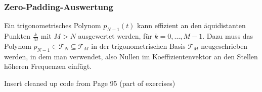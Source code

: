 \newpage
\subsubsection{Zero-Padding-Auswertung}
Ein trigonometrisches Polynom $p_{N - 1}(t)$ kann effizient an den äquidistanten Punkten $\frac{k}{M}$ mit $M > N$ ausgewertet werden, für $k = 0, \ldots, M - 1$.
Dazu muss das Polynom $p_{N - 1} \in \mathcal{T}_N \subseteq \mathcal{T}_M$ in der trigonometrischen Basis $\mathcal{T}_M$ neugeschrieben werden,
in dem man  verwendet, also Nullen im Koeffizientenvektor an den Stellen höheren Frequenzen einfügt.

\TODO Insert cleaned up code from Page 95 (part of exercises)
